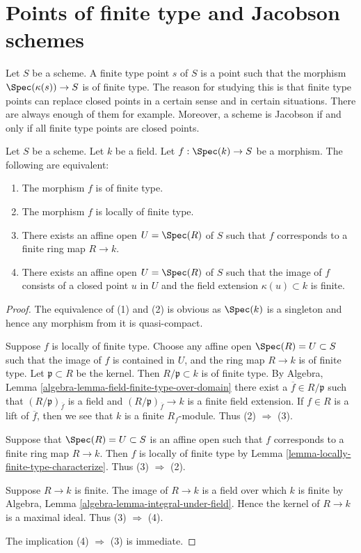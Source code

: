 \section{Points of finite type and Jacobson schemes}
\label{section-points-finite-type}

\noindent
Let $S$ be a scheme. A finite type point $s$ of $S$ is a point such
that the morphism $\Spec(\kappa(s)) \to S$ is of finite type.
The reason for studying this is that finite type points can replace
closed points in a certain sense and in certain situations.
There are always enough of them for example. Moreover, a scheme
is Jacobson if and only if all finite type points are closed points.

\begin{lemma}
\label{lemma-point-finite-type}
Let $S$ be a scheme. Let $k$ be a field.
Let $f : \Spec(k) \to S$ be a morphism.
The following are equivalent:
\begin{enumerate}
\item The morphism $f$ is of finite type.
\item The morphism $f$ is locally of finite type.
\item There exists an affine open $U = \Spec(R)$ of $S$
such that $f$ corresponds to a finite ring map $R \to k$.
\item There exists an affine open $U = \Spec(R)$ of $S$
such that the image of $f$ consists of a closed point $u$ in $U$
and the field extension $\kappa(u) \subset k$ is finite.
\end{enumerate}
\end{lemma}

\begin{proof}
The equivalence of (1) and (2) is obvious as $\Spec(k)$
is a singleton and hence any morphism from it is quasi-compact.

\medskip\noindent
Suppose $f$ is locally of finite type. Choose any affine open
$\Spec(R) = U \subset S$ such that the image of $f$
is contained in $U$, and the ring map $R \to k$
is of finite type. Let $\mathfrak p \subset R$ be the kernel.
Then $R/\mathfrak p \subset k$ is of finite type. By
Algebra, Lemma \ref{algebra-lemma-field-finite-type-over-domain}
there exist a $\overline{f} \in R/\mathfrak p$ such that
$(R/\mathfrak p)_{\overline{f}}$ is a field and
$(R/\mathfrak p)_{\overline{f}} \to k$ is a finite field
extension. If $f \in R$ is a lift of $\overline{f}$, then
we see that $k$ is a finite $R_f$-module. Thus (2) $\Rightarrow$ (3).

\medskip\noindent
Suppose that $\Spec(R) = U \subset S$ is an affine open
such that $f$ corresponds to a finite ring map $R \to k$.
Then $f$ is locally of finite type
by Lemma \ref{lemma-locally-finite-type-characterize}.
Thus (3) $\Rightarrow$ (2).

\medskip\noindent
Suppose $R \to k$ is finite. The image of $R \to k$ is a field
over which $k$ is finite by
Algebra, Lemma \ref{algebra-lemma-integral-under-field}.
Hence the kernel of $R \to k$ is a maximal ideal.
Thus (3) $\Rightarrow$ (4).

\medskip\noindent
The implication (4) $\Rightarrow$ (3) is immediate.
\end{proof}

